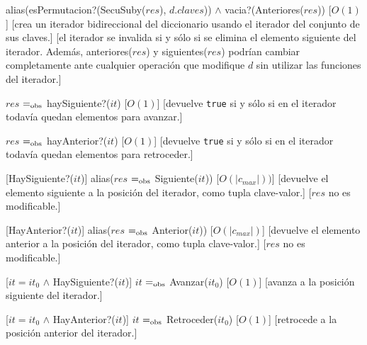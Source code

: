 \begin{Interfaz}
	{alias(esPermutacion?(SecuSuby($res$), $d.claves$)) $\land$ vacia?(Anteriores($res$))}
	[$O(1)$]
	[crea un iterador bidireccional del diccionario usando el iterador del conjunto de sus claves.]
	[el iterador se invalida si y sólo si se elimina el elemento siguiente del iterador. Además, anteriores($res$) y siguientes($res$) podrían cambiar completamente ante cualquier operación que modifique $d$ sin utilizar las funciones del iterador.]

	{$res$ $=_{\mathrm{obs}}$ haySiguiente?($it$)}
	[$O(1)$]
	[devuelve \texttt{true} si y sólo si en el iterador todavía quedan elementos para avanzar.]

	{$res$ $=_{\mathrm{obs}}$ hayAnterior?($it$)}
	[$O(1)$]
	[devuelve \texttt{true} si y sólo si en el iterador todavía quedan elementos para retroceder.]

	[HaySiguiente?($it$)]
	{alias($res$ $=_{\mathrm{obs}}$ Siguiente($it$))}
	[$O(|c_{max}|))$]
	[devuelve el elemento siguiente a la posición del iterador, como tupla clave-valor.]
	[$res$ no es modificable.]

	[HayAnterior?($it$)]
	{alias($res$ $=_{\mathrm{obs}}$ Anterior($it$))}
	[$O(|c_{max}|)$]
	[devuelve el elemento anterior a la posición del iterador, como tupla clave-valor.]
	[$res$ no es modificable.]

	[$it = it_0$ $\land$ HaySiguiente?($it$)]
	{$it$ $=_{\mathrm{obs}}$ Avanzar($it_0$)}
	[$O(1)$]
	[avanza a la posición siguiente del iterador.]

	[$it = it_0$ $\land$ HayAnterior?($it$)]
	{$it$ $=_{\mathrm{obs}}$ Retroceder($it_0$)}
	[$O(1)$]
	[retrocede a la posición anterior del iterador.]

\end{Interfaz}

